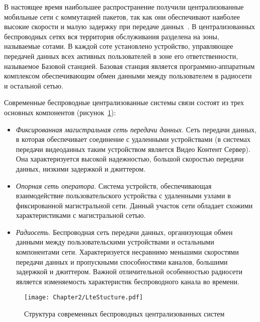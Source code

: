 В настоящее время наибольшее распространение получили централизованные мобильные сети с коммутацией пакетов, так как они обеспечивают наиболее высокие скорости и малую задержку при передаче данных~\cite{Cisco}. В централизованных беспроводных сетях вся территория обслуживания разделена на зоны, называемые сотами. В каждой соте установлено устройство, управляющее передачей данных всех активных пользователей в зоне его ответственности, называемое Базовой станцией. Базовая станция является программно-аппаратным комплексом обеспечивающим обмен данными между пользователем в радиосети и остальной сетью.

Современные беспроводные централизованные системы связи состоят из трех основных компонентов (рисунок~\ref{fig:LteStructure}):
\begin{itemize}
  \item \textit{Фиксированная магистральная сеть передачи данных}. Сеть передачи данных, в которая обеспечивает соединение с удаленными устройствами (в системах передачи видеоданных таким устройством является Видео Контент Сервер). Она характеризуется высокой надежностью, большой скоростью передачи данных, низкими задержкой и джиттером.
  \item \textit{Опорная сеть оператора}. Система устройств, обеспечивающая взаимодействие пользовательского устройства с удаленными узлами в фиксированной магистральной сети. Данный участок сети обладает схожими характеристиками с магистральной сетью.
  \item \textit{Радиосеть}. Беспроводная сеть передачи данных, организующая обмен данными между пользовательскими устройствами и остальными компонентами сети. Характеризуется несравнимо меньшими скоростями передачи данных и пропускными способностями каналов, большими задержкой и джиттером. Важной отличительной особенностью радиосети является изменяемость характеристик беспроводного канала во времени.
\end{itemize}

\begin{figure}[htbp]
\begin{center}
\texttt{[image: Chapter2/LteStucture.pdf]}
\caption{Структура современных беспроводных централизованных систем}
\label{fig:LteStructure}
\end{center}
\end{figure}

